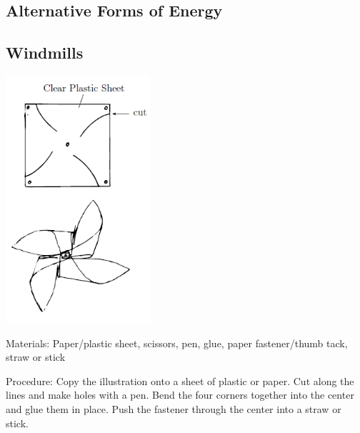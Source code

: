 \begin{multicols}{2}

\section*{Alternative Forms of Energy}


\subsection{Windmills}

\begin{center}
\includegraphics[width=0.4\textwidth]{./img/windmill.png}
\end{center}

\begin{description*}
\item[Materials:]{Paper/plastic sheet, scissors, pen, glue, paper fastener/thumb tack, straw or stick}
\item[Procedure:]{Copy the illustration onto a sheet of plastic or paper. Cut along the lines and make holes with a pen. Bend the four corners together into the center and glue them in place. Push the fastener through the center into a straw or stick.}
\end{description*}



\end{multicols}

\pagebreak